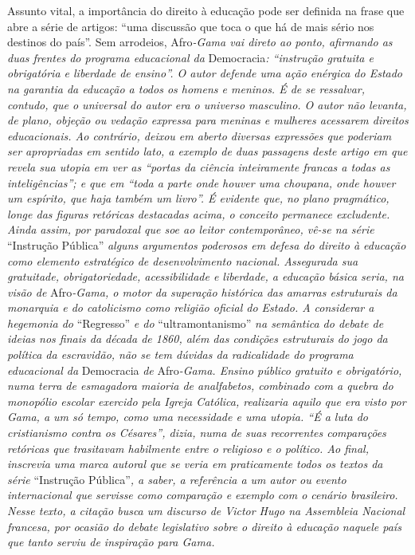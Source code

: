 \begin{didascalia}
Assunto vital, a importância do direito à educação pode ser definida na
frase que abre a série de artigos: ``uma discussão que toca o que há de
mais sério nos destinos do país''. Sem arrodeios, Afro\emph{-Gama vai
direto ao ponto, afirmando as duas frentes do programa educacional da}
Democracia\emph{: ``instrução gratuita e obrigatória e liberdade de
ensino''. O autor defende uma ação enérgica do Estado na garantia da
educação a todos os homens e meninos. É de se ressalvar, contudo, que o
universal do autor era o universo masculino. O autor não levanta, de
plano, objeção ou vedação expressa para meninas e mulheres acessarem
direitos educacionais. Ao contrário, deixou em aberto diversas
expressões que poderiam ser apropriadas em sentido lato, a exemplo de
duas passagens deste artigo em que revela sua utopia em ver as ``portas
da ciência inteiramente francas a todas as inteligências''; e que em
``toda a parte onde houver uma choupana, onde houver um espírito, que
haja também um livro''. É evidente que, no plano pragmático, longe das
figuras retóricas destacadas acima, o conceito permanece excludente.
Ainda assim, por paradoxal que soe ao leitor contemporâneo, vê-se na
série} ``Instrução Pública'' \emph{alguns argumentos poderosos em defesa
do direito à educação como elemento estratégico de desenvolvimento
nacional. Assegurada sua gratuitade, obrigatoriedade, acessibilidade e
liberdade, a educação básica seria, na visão de} Afro\emph{-Gama, o
motor da superação histórica das amarras estruturais da monarquia e do
catolicismo como religião oficial do Estado. A considerar a hegemonia
do} ``Regresso'' \emph{e do} ``ultramontanismo'' \emph{na semântica do
debate de ideias nos finais da década de 1860, além das condições
estruturais do jogo da política da escravidão, não se tem dúvidas da
radicalidade do programa educacional da} Democracia \emph{de}
Afro\emph{-Gama. Ensino público gratuito e obrigatório, numa terra de
esmagadora maioria de analfabetos, combinado com a quebra do monopólio
escolar exercido pela Igreja Católica, realizaria aquilo que era visto
por Gama, a um só tempo, como uma necessidade e uma utopia. ``É a luta do
cristianismo contra os Césares'', dizia, numa de suas recorrentes
comparações retóricas que trasitavam habilmente entre o religioso e o
político. Ao final, inscrevia uma marca autoral que se veria em
praticamente todos os textos da série} ``Instrução Pública''\emph{, a
saber, a referência a um autor ou evento internacional que servisse como
comparação e exemplo com o cenário brasileiro. Nesse texto, a citação
busca um discurso de Victor Hugo na Assembleia Nacional francesa, por
ocasião do debate legislativo sobre o direito à educação naquele país
que tanto serviu de inspiração para Gama.}
\end{didascalia}




